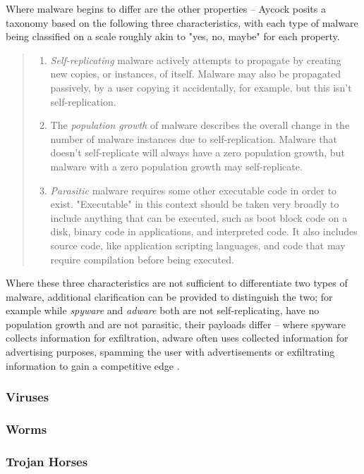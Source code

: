 Where malware begins to differ are the other properties -- Aycock posits a taxonomy based on the following three 
characteristics, with each type of malware being classified on a scale roughly akin to "yes, no, maybe"
for each property.
\begin{quote}
  \begin{enumerate}
    \item \emph{Self-replicating} malware actively attempts to propagate by creating new copies, or instances, 
      of itself. Malware may also be propagated passively, by a user copying it accidentally, for example, 
      but this isn't self-replication.
    \item The \emph{population growth} of malware describes the overall change in the number of malware instances due to
      self-replication. Malware that doesn't self-replicate will always have a zero population growth, but malware with a
      zero population growth may self-replicate.
    \item \emph{Parasitic} malware requires some other executable code in order to exist. "Executable" in this context 
      should be taken very broadly to include anything that can be executed, such as boot block code on a disk, binary 
      code in applications, and interpreted code. It also includes source code, like application scripting languages,
      and code that may require compilation before being executed.
  \end{enumerate}
  \cite[p.~11-12]{aycock-book}
\end{quote}
Where these three characteristics are not sufficient to differentiate two types of malware, additional clarification can
be provided to distinguish the two; for example while \emph{spyware} and \emph{adware} both are not self-replicating,
have no population growth and are not parasitic, their payloads differ -- where spyware collects information for
exfiltration, adware often uses collected information for advertising purposes, spamming the user with advertisements
or exfiltrating information to gain a competitive edge \cite[p.~16-17]{aycock-book}. 

\subsubsection{Viruses}
\subsubsection{Worms}
\subsubsection{Trojan Horses}
